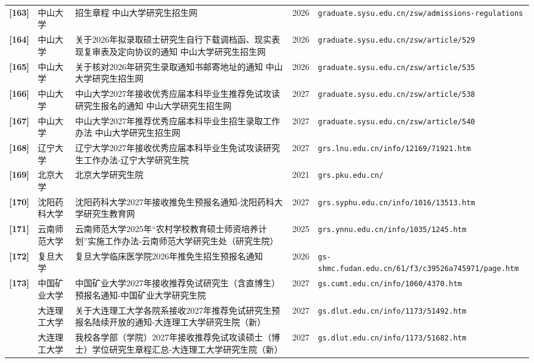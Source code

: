 {\begin{longtable}{@{}p{1.15cm}p{2.9cm}p{6.3cm}p{0.85cm}p{5.0cm}@{}}
\textbf{[163]} & 中山大学 & 招生章程 \textbar{} 中山大学研究生招生网 & 2026 & \texttt{graduate.sysu.edu.cn/zsw/admissions-regulations} \\
\textbf{[164]} & 中山大学 & 关于2026年拟录取硕士研究生自行下载调档函、现实表现复审表及定向协议的通知 \textbar{} 中山大学研究生招生网 & 2026 & \texttt{graduate.sysu.edu.cn/zsw/article/529} \\
\textbf{[165]} & 中山大学 & 关于核对2026年研究生录取通知书邮寄地址的通知 \textbar{} 中山大学研究生招生网 & 2026 & \texttt{graduate.sysu.edu.cn/zsw/article/535} \\
\textbf{[166]} & 中山大学 & 中山大学2027年接收优秀应届本科毕业生推荐免试攻读研究生报名的通知 \textbar{} 中山大学研究生招生网 & 2027 & \texttt{graduate.sysu.edu.cn/zsw/article/538} \\
\textbf{[167]} & 中山大学 & 中山大学2027年推荐优秀应届本科毕业生招生录取工作办法 \textbar{} 中山大学研究生招生网 & 2027 & \texttt{graduate.sysu.edu.cn/zsw/article/540} \\
\textbf{[168]} & 辽宁大学 & 辽宁大学2027年接收优秀应届本科毕业生免试攻读研究生工作办法-辽宁大学研究生院 & 2027 & \texttt{grs.lnu.edu.cn/info/12169/71921.htm} \\
\textbf{[169]} & 北京大学 & 北京大学研究生院 & 2021 & \texttt{grs.pku.edu.cn/} \\
\textbf{[170]} & 沈阳药科大学 & 沈阳药科大学2027年接收推免生预报名通知-沈阳药科大学研究生教育网 & 2027 & \texttt{grs.syphu.edu.cn/info/1016/13513.htm} \\
\textbf{[171]} & 云南师范大学 & 云南师范大学2025年“农村学校教育硕士师资培养计划”实施工作办法-云南师范大学研究生处（研究生院） & 2025 & \texttt{grs.ynnu.edu.cn/info/1035/1245.htm} \\
\textbf{[172]} & 复旦大学 & 复旦大学临床医学院2026年推免生招生预报名通知 & 2026 & \texttt{gs-shmc.fudan.edu.cn/61/f3/c39526a745971/page.htm} \\
\textbf{[173]} & 中国矿业大学 & 中国矿业大学2027年接收推荐免试研究生（含直博生）预报名通知-中国矿业大学研究生院 & 2027 & \texttt{gs.cumt.edu.cn/info/1060/4370.htm} \\
[174] & 大连理工大学 & 关于大连理工大学各院系接收2027年推荐免试研究生预报名陆续开放的通知-大连理工大学研究生院（新） & 2027 & \texttt{gs.dlut.edu.cn/info/1173/51492.htm} \\
[175] & 大连理工大学 & 我校各学部（学院）2027年接收推荐免试攻读硕士（博士）学位研究生章程汇总-大连理工大学研究生院（新） & 2027 & \texttt{gs.dlut.edu.cn/info/1173/51682.htm} \\

\end{longtable}}
